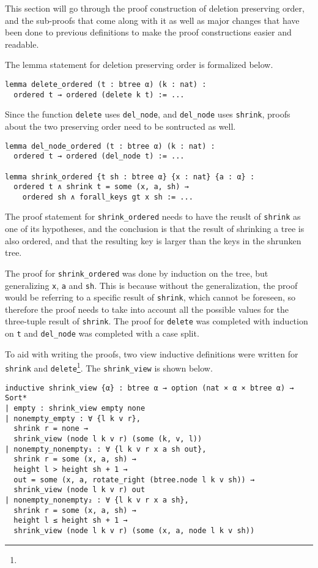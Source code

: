 This section will go through the proof construction of deletion preserving order, and the sub-proofs that come along with it as well as major changes that have been done to previous definitions to make the proof constructions easier and readable.

The lemma statement for deletion preserving order is formalized below.

\begin{lstlisting}
lemma delete_ordered (t : btree α) (k : nat) :
  ordered t → ordered (delete k t) := ...
\end{lstlisting}

Since the function \lstinline{delete} uses \lstinline{del_node}, and \lstinline{del_node} uses \lstinline{shrink}, proofs about the two preserving order need to be sontructed as well.

\begin{lstlisting}
lemma del_node_ordered (t : btree α) (k : nat) :
  ordered t → ordered (del_node t) := ...

lemma shrink_ordered {t sh : btree α} {x : nat} {a : α} :
  ordered t ∧ shrink t = some (x, a, sh) →
    ordered sh ∧ forall_keys gt x sh := ...
\end{lstlisting}

The proof statement for \lstinline{shrink_ordered} needs to have the reuslt of \lstinline{shrink} as one of its hypotheses, and the conclusion is that the result of shrinking a tree is also ordered, and that the resulting key is larger than the keys in the shrunken tree.

The proof for \lstinline{shrink_ordered} was done by induction on the tree, but generalizing \lstinline{x}, \lstinline{a} and \lstinline{sh}. This is because without the generalization, the proof would be referring to a specific result of \lstinline{shrink}, which cannot be foreseen, so therefore the proof needs to take into account all the possible values for the three-tuple result of \lstinline{shrink}. The proof for \lstinline{delete} was completed with induction on \lstinline{t} and \lstinline{del_node} was completed with a case split.

To aid with writing the proofs, two view inductive definitions were written for \lstinline{shrink} and \lstinline{delete}\footnote{}. The \lstinline{shrink_view} is shown below.

\begin{lstlisting}
inductive shrink_view {α} : btree α → option (nat × α × btree α) → Sort*
| empty : shrink_view empty none
| nonempty_empty : ∀ {l k v r},
  shrink r = none →
  shrink_view (node l k v r) (some (k, v, l))
| nonempty_nonempty₁ : ∀ {l k v r x a sh out},
  shrink r = some (x, a, sh) →
  height l > height sh + 1 →
  out = some (x, a, rotate_right (btree.node l k v sh)) →
  shrink_view (node l k v r) out
| nonempty_nonempty₂ : ∀ {l k v r x a sh},
  shrink r = some (x, a, sh) →
  height l ≤ height sh + 1 →
  shrink_view (node l k v r) (some (x, a, node l k v sh))
\end{lstlisting}

